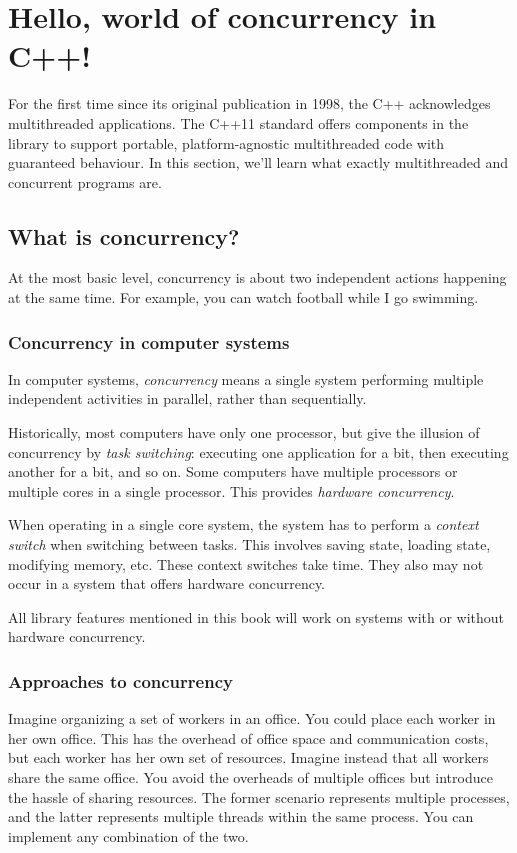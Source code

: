 \section{Hello, world of concurrency in C++!}
For the first time since its original publication in 1998, the C++ acknowledges multithreaded applications. The C++11 standard offers components in the library to support portable, platform-agnostic multithreaded code with guaranteed behaviour. In this section, we'll learn what exactly multithreaded and concurrent programs are.

\subsection{What is concurrency?}
At the most basic level, concurrency is about two independent actions happening at the same time. For example, you can watch football while I go swimming.

\subsubsection{Concurrency in computer systems}
In computer systems, \emph{concurrency} means a single system performing multiple independent activities in parallel, rather than sequentially.

Historically, most computers have only one processor, but give the illusion of concurrency by \emph{task switching}: executing one application for a bit, then executing another for a bit, and so on. Some computers have multiple processors or multiple cores in a single processor. This provides \emph{hardware concurrency}.

When operating in a single core system, the system has to perform a \emph{context switch} when switching between tasks. This involves saving state, loading state, modifying memory, etc. These context switches take time. They also may not occur in a system that offers hardware concurrency.

All library features mentioned in this book will work on systems with or without hardware concurrency.

\subsubsection{Approaches to concurrency}

Imagine organizing a set of workers in an office. You could place each worker in her own office. This has the overhead of office space and communication costs, but each worker has her own set of resources. Imagine instead that all workers share the same office. You avoid the overheads of multiple offices but introduce the hassle of sharing resources. The former scenario represents multiple processes, and the latter represents multiple threads within the same process. You can implement any combination of the two.

